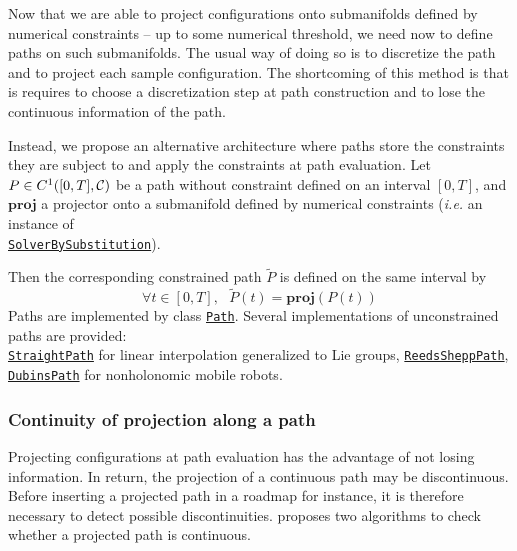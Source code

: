 Now that we are able to project configurations onto submanifolds defined by numerical constraints -- up to some numerical threshold, we need now to define paths on such submanifolds. The usual way of doing so is to discretize the path and to project each sample configuration. The shortcoming of this method is that is requires to choose a discretization step at path construction and to lose the continuous information of the path.

Instead, we propose an alternative architecture where paths store the constraints they are subject to and apply the constraints at path evaluation. Let $P\in C^1([0,T],\mathcal{C})$ be a path without constraint defined on an interval $[0,T]$, and $\mathbf{proj}$ a projector onto a submanifold defined by numerical constraints (\textit{i.e.} an instance of\\ \href{https://gepettoweb.laas.fr/hpp/hpp-constraints/doxygen-html/classhpp_1_1constraints_1_1solver_1_1BySubstitution.html}{\texttt{SolverBySubstitution}}).

Then the corresponding constrained path $\tilde{P}$ is defined on the same interval by
$$
\forall t\in[0,T],\ \ \ \tilde{P}(t) = \mathbf{proj}(P(t))
$$
Paths are implemented by class \href{https://gepettoweb.laas.fr/hpp/hpp-core/doxygen-html/classhpp_1_1core_1_1Path.html}{\texttt{Path}}. Several implementations of unconstrained paths are provided:\\
\href{https://gepettoweb.laas.fr/hpp/hpp-core/doxygen-html/classhpp_1_1core_1_1StraightPath.html}{\texttt{StraightPath}} for linear interpolation generalized to Lie groups, \href{https://gepettoweb.laas.fr/hpp/hpp-core/doxygen-html/classhpp_1_1core_1_1ReedsSheppPath.html}{\texttt{ReedsSheppPath}}, \href{https://gepettoweb.laas.fr/hpp/hpp-core/doxygen-html/classhpp_1_1core_1_1DubinsPath.html}{\texttt{DubinsPath}} for non\-holo\-nomic mobile robots.

\subsubsection{Continuity of projection along a path}

Projecting configurations at path evaluation has the advantage of not losing information. In return, the projection of a continuous path may be discontinuous. Before inserting a projected path in a roadmap for instance, it is therefore necessary to detect possible discontinuities. \cite{mirabel:hal-01360409} proposes two algorithms to check whether a projected path is continuous.

